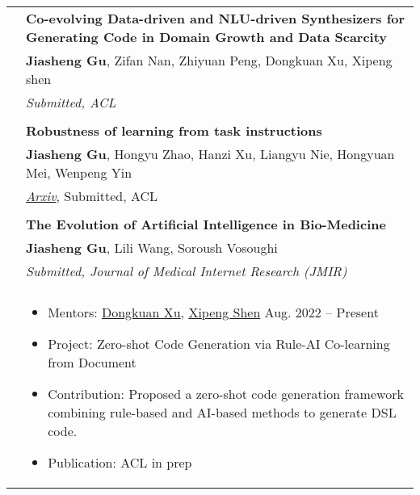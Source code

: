 \documentclass[letterpaper, 10pt]{article}
\begin{document}
\begin{longtable}{p{1.3in}p{4.8in}}

\nohyphens{\color{black}{Publications}}
& \textbf{Co-evolving Data-driven and NLU-driven Synthesizers for Generating Code in Domain Growth and Data Scarcity\label{few-shot_code}}  \\
& \textbf{Jiasheng Gu}, Zifan Nan, Zhiyuan Peng, Dongkuan Xu, Xipeng shen \\
& \textit{Submitted, ACL}\\
& \\

& \textbf{Robustness of learning from task instructions \label{robustness_instruction}} \\
& \textbf{Jiasheng Gu}, Hongyu Zhao, Hanzi Xu, Liangyu Nie, Hongyuan Mei, Wenpeng Yin \\
& \href{https://arxiv.org/abs/2212.03813}{\textit{Arxiv}}, Submitted, ACL\\
& \\

& \textbf{The Evolution of Artificial Intelligence in Bio-Medicine} \label{JMIR} \\
& \textbf{Jiasheng Gu}, Lili Wang, Soroush Vosoughi \\
& \textit{Submitted, Journal of Medical Internet Research (JMIR)}\\
& \\


\nohyphens{\color{black}{Research Experience}} 

&  \begin{itemize}[leftmargin=10pt, itemsep=-5pt, topsep=0pt,before=\textbf{North Carolina State University}]
    \item Mentors: \href{http://personal.psu.edu/dux19/}{Dongkuan Xu}, \href{https://people.engr.ncsu.edu/xshen5/}{Xipeng Shen} \hfill Aug. 2022 -- Present 
    \item Project: Zero-shot Code Generation via Rule-AI Co-learning from Document
    \item Contribution: Proposed a zero-shot code generation framework combining rule-based and AI-based methods to generate DSL code.
    \item Publication: ACL in prep
  \end{itemize}\\ 


\end{longtable}
\end{document}
